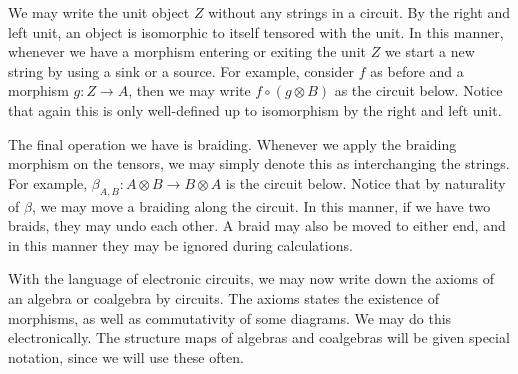 \documentclass[../thesis.tex]{subfiles}
\begin{document}
            We may write the unit object $Z$ without any strings in a circuit. By the right and left unit, an object is isomorphic to itself tensored with the unit. In this manner, whenever we have a morphism entering or exiting the unit $Z$ we start a new string by using a sink or a source. For example, consider $f$ as before and a morphism $g : Z \rightarrow A$, then we may write $f \circ (g \otimes B)$ as the circuit below. Notice that again this is only well-defined up to isomorphism by the right and left unit.
            \begin{center}
            \end{center}

            The final operation we have is braiding. Whenever we apply the braiding morphism on the tensors, we may simply denote this as interchanging the strings. For example, $\beta_{A,B} : A \otimes B \rightarrow B \otimes A$ is the circuit below. Notice that by naturality of $\beta$, we may move a braiding along the circuit. In this manner, if we have two braids, they may undo each other. A braid may also be moved to either end, and in this manner they may be ignored during calculations.
            \begin{center}
            \end{center}

            With the language of electronic circuits, we may now write down the axioms of an algebra or coalgebra by circuits. The axioms states the existence of morphisms, as well as commutativity of some diagrams. We may do this electronically. The structure maps of algebras and coalgebras will be given special notation, since we will use these often.
\end{document}
